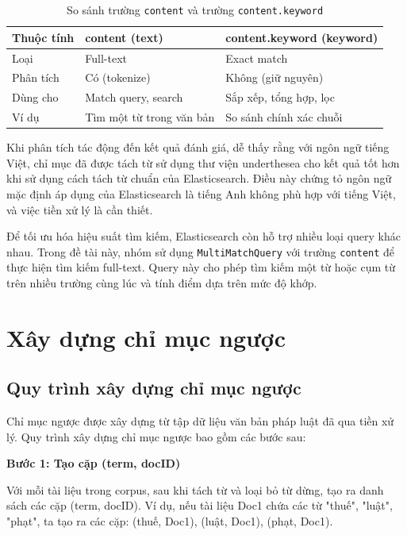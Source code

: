 \documentclass[../BTL.tex]{subfiles}
\begin{document}
\begin{table}[H]
\centering
\begin{tabular}{|l|l|l|}
\hline
Thuộc tính & content (text) & content.keyword (keyword) \\ \hline
Loại & Full-text & Exact match \\ \hline
Phân tích & Có (tokenize) & Không (giữ nguyên) \\ \hline
Dùng cho & Match query, search & Sắp xếp, tổng hợp, lọc \\ \hline
Ví dụ & Tìm một từ trong văn bản & So sánh chính xác chuỗi \\ \hline
\end{tabular}
\caption{So sánh trường \texttt{content} và trường \texttt{content.keyword}}
\label{tab:content-vs-content-keyword}
\end{table}

Khi phân tích tác động đến kết quả đánh giá, dễ thấy rằng với ngôn ngữ tiếng Việt, chỉ mục đã được tách từ sử dụng thư viện underthesea cho kết quả tốt hơn khi sử dụng cách tách từ chuẩn của Elasticsearch. Điều này chứng tỏ ngôn ngữ mặc định áp dụng của Elasticsearch là tiếng Anh không phù hợp với tiếng Việt, và việc tiền xử lý là cần thiết.

Để tối ưu hóa hiệu suất tìm kiếm, Elasticsearch còn hỗ trợ nhiều loại query khác nhau. Trong đề tài này, nhóm sử dụng \texttt{MultiMatchQuery} với trường \texttt{content} để thực hiện tìm kiếm full-text. Query này cho phép tìm kiếm một từ hoặc cụm từ trên nhiều trường cùng lúc và tính điểm dựa trên mức độ khớp.


\section{Xây dựng chỉ mục ngược}
\subsection{Quy trình xây dựng chỉ mục ngược}

Chỉ mục ngược được xây dựng từ tập dữ liệu văn bản pháp luật đã qua tiền xử lý. Quy trình xây dựng chỉ mục ngược bao gồm các bước sau:

\textbf{Bước 1: Tạo cặp (term, docID)}

Với mỗi tài liệu trong corpus, sau khi tách từ và loại bỏ từ dừng, tạo ra danh sách các cặp (term, docID). Ví dụ, nếu tài liệu Doc1 chứa các từ "thuế", "luật", "phạt", ta tạo ra các cặp: (thuế, Doc1), (luật, Doc1), (phạt, Doc1).
\end{document}
